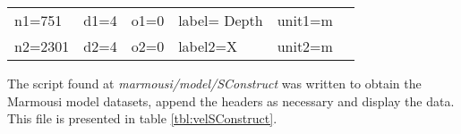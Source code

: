 {
\begin{tabular}{|llllll|}
        \hline        
    n1=751    &     d1=4   &        o1=0  &        label= Depth & unit1=m &  \\ 
    n2=2301   &     d2=4   &        o2=0  &        label2=X     & unit2=m &  \\
	\hline
\end{tabular}
}

The script found at \emph{marmousi/model/SConstruct} was written to obtain the Marmousi model datasets, append the headers as necessary and display the  data.  This file is presented in table \ref{tbl:velSConstruct}.
 
{
\tiny

\normalsize
}


